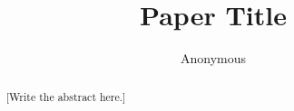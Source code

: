 \documentclass[sigconf,10pt]{acmart}
\begin{document}

\title{Paper Title}

\author{Anonymous}

\begin{abstract}
[Write the abstract here.]
\end{abstract}

\maketitle














\end{document}

